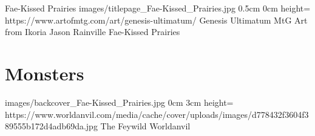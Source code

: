 \documentclass[letterpaper,openany,twoside,twocolumn]{book}
\begin{document}
	\regionTitlePage
		{Fae-Kissed Prairies}
		{images/titlepage_Fae-Kissed_Prairies.jpg}
		{0.5cm}
		{0cm}
		{height=\paperheight}
		{https://www.artofmtg.com/art/genesis-ultimatum/}
		{Genesis Ultimatum MtG Art from Ikoria}
		{Jason Rainville}
		{Fae-Kissed Prairies}
	
	\tableofcontents
	
	\mainmatter
	
	\MonsterSheetGeometry
	\part{Monsters}
	
	
	
	\regionLastPage
		{images/backcover_Fae-Kissed_Prairies.jpg}
		{0cm}
		{3cm}
		{height=\paperheight}
		{https://www.worldanvil.com/media/cache/cover/uploads/images/d778432f3604f389555b172d4adb69da.jpg}
		{The Feywild}
		{Worldanvil}
		{}
\end{document}
